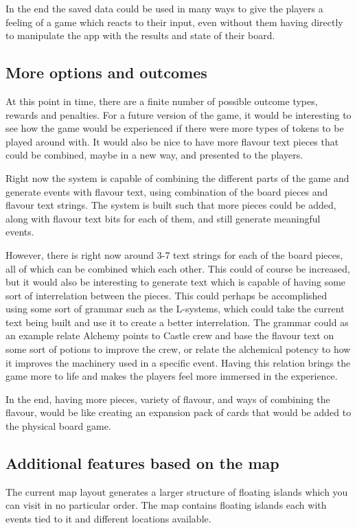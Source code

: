 In the end the saved data could be used in many ways to give the players a feeling of a game which reacts to their input, even without them having directly to manipulate the app with the results and state of their board.

\subsection{More options and outcomes}
At this point in time, there are a finite number of possible outcome types, rewards and penalties. For a future version of the game, it would be interesting to see how the game would be experienced if there were more types of tokens to be played around with. It would also be nice to have more flavour text pieces that could be combined, maybe in a new way, and presented to the players. 

Right now the system is capable of combining the different parts of the game and generate events with flavour text, using combination of the board pieces and flavour text strings.
The system is built such that more pieces could be added, along with flavour text bits for each of them, and still generate meaningful events. 

However, there is right now around 3-7 text strings for each of the board pieces, all of which can be combined which each other. This could of course be increased, but it would also be interesting to generate text which is capable of having some sort of interrelation between the pieces. 
This could perhaps be accomplished using some sort of grammar such as the L-systems, which could take the current text being built and use it to create a better interrelation. 
The grammar could as an example relate Alchemy points to Castle crew and base the flavour text on some sort of potions to improve the crew, or relate the alchemical potency to how it improves the machinery used in a specific event. 
Having this relation brings the game more to life and makes the players feel more immersed in the experience.

In the end, having more pieces, variety of flavour, and ways of combining the flavour, would be like creating an expansion pack of cards that would be added to the physical board game.

\subsection{Additional features based on the map}
The current map layout generates a larger structure of floating islands which you can visit in no particular order. The map contains floating islands each with events tied to it and different locations available.

